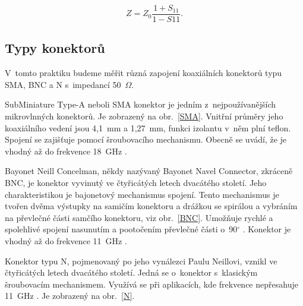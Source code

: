 \documentclass{protokol}
\newcommand\sparam{S}
\newcommand\impedance{Z}
\begin{document}
\begin{equation}
	\impedance = \impedance_{0}\frac{1+\sparam_{11}}{1-\sparam{11}}.
	\label{eq:Z}
\end{equation}


\subsection{Typy konektorů}
V~tomto praktiku budeme měřit různá zapojení koaxiálních konektorů typu
SMA, BNC a N s~impedancí 50~$\Omega$.

SubMiniature Type-A neboli SMA konektor je jedním z~nejpoužívanějších
mikrovlnných konektorů. Je zobrazený na obr.~\ref{SMA}.
Vnitřní průměry jeho koaxiálního vedení jsou 4,1~mm a 1,27~mm,
funkci izolantu v~něm plní teflon.
Spojení se zajišťuje pomocí šroubovacího mechanismu.
Obecně se uvádí, že je vhodný až do frekvence 18~GHz \cite{rfhandbook}.

Bayonet Neill Concelman, někdy nazývaný Bayonet Navel Connector,
zkráceně BNC, je konektor vyvinutý ve čtyřicátých letech dvacátého století.
Jeho charakteristikou je bajonetový mechanismus spojení.
Tento mechanismus je tvořen dvěma výstupky na samičím konektoru
a drážkou se spirálou a vybráním na převlečné části samčího konektoru,
viz obr.~\ref{BNC}.
Umožňuje rychlé a spolehlivé spojení nasunutím a pootočením převlečné
části o~90$^{\circ}$ \cite{czwiki}.
Konektor je vhodný až do frekvence 11~GHz \cite{rfhandbook}.

Konektor typu N, pojmenovaný po jeho vynálezci Paulu Neillovi,
vznikl ve čtyřicátých letech dvacátého století.
Jedná se o~konektor s~klasickým šroubovacím mechanismem.
Využívá se při aplikacích, kde frekvence nepřesahuje 11~GHz \cite{rfhandbook}.
Je zobrazený na obr.~\ref{N}.
\end{document}

